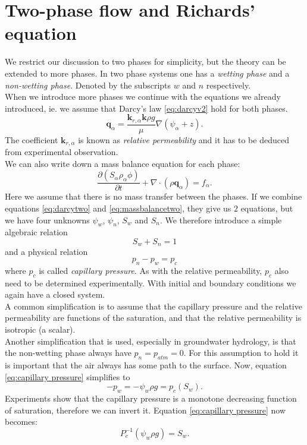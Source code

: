 \documentclass[../Main/main.tex]{subfiles}
\begin{document}
\section*{Two-phase flow and Richards' equation}
We restrict our discussion to two phases for simplicity, but the theory can be extended to more phases. In two phase systems one has a \emph{wetting phase} and a \emph{non-wetting phase}. Denoted by the subscripts $w$ and $n$ respectively. \\
When we introduce more phases we continue with the equations we already introduced, ie. we assume that Darcy's law  \eqref{eq:darcyv2} hold for both phases.
\begin{equation}\label{eq:darcytwo}
	\bm{q}_{\alpha} = \frac{\bm{k}_{r,\alpha}\bm{k}\rho g}{\mu}\nabla(\psi_{\alpha} + z).
\end{equation}
The coefficient $\bm{k}_{r,\alpha}$ is known as \emph{relative permeability} and it has to be deduced from experimental observation. \\ We can also write down a mass balance equation for each phase:
\begin{equation}\label{eq:massbalancetwo}
	\frac{\partial (S_{\alpha}\rho_{\alpha} \phi) }{\partial t} + \nabla \cdot (\rho \bm{q}_{\alpha}) = f_{\alpha}.
\end{equation}
Here we assume that there is no mass transfer between the phases.
If we combine equations \eqref{eq:darcytwo} and \eqref{eq:massbalancetwo}, they give us $2$ equations, but we have four unknowns $\psi_w$, $\psi_n$, $S_w$ and $S_n$. We therefore introduce a simple algebraic relation
\begin{equation*}
	S_w + S_n = 1
\end{equation*}
and a physical relation
\begin{equation}\label{eq:capillary pressure}
	p_n-p_w = p_c
\end{equation}
where $p_c$ is called \emph{capillary pressure}. As with the relative permeability, $p_c$ also need to be determined experimentally.
With initial and boundary conditions we again have a closed system.\\
A common simplification is to assume that the capillary pressure and the relative permeability are functions of the saturation, and that the relative permeability is isotropic (a scalar). \\
Another simplification that is used, especially in groundwater hydrology, is that the non-wetting phase always have $p_n = p_{atm}=0$. For this assumption to hold it is important that the air always has some path to the surface. Now, equation \eqref{eq:capillary pressure} simplifies to
\begin{equation}\label{eq:groundwater capillary pressure}
	-p_w = -\psi_w\rho g = p_c(S_w).
\end{equation}
Experiments show that the capillary pressure is a monotone decreasing function of saturation, therefore we can invert it. Equation \eqref{eq:capillary pressure} now becomes:
\begin{equation}
	P_c^{-1}(\psi_w\rho g) = S_w.
\end{equation}
\end{document}
